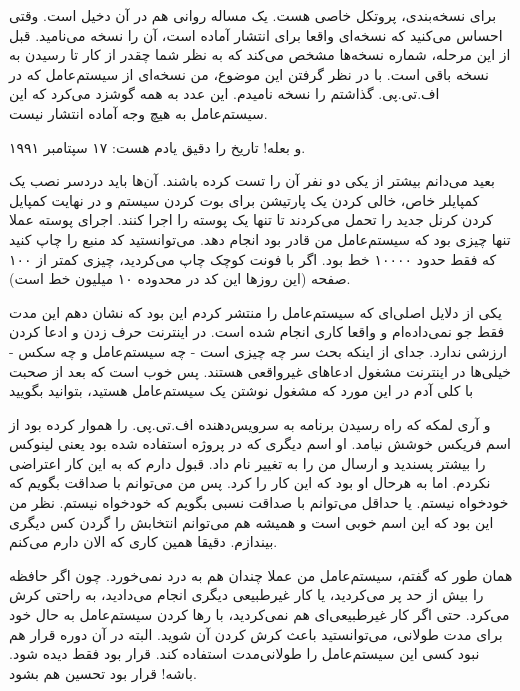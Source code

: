 برای نسخه‌بندی، پروتکل خاصی هست. یک مساله روانی هم در آن دخیل است. وقتی
احساس می‌کنید که نسخه‌ای واقعا برای انتشار آماده است، آن را نسخه
 می‌نامید. قبل از این مرحله، شماره نسخه‌ها مشخص می‌کند که به
نظر شما چقدر از کار تا رسیدن به نسخه  باقی است. با در نظر
گرفتن این موضوع، من نسخه‌ای از سیستم‌عامل که در اف.تی.پی. گذاشتم را نسخه
 نامیدم. این عدد به همه گوشزد می‌کرد که این سیستم‌عامل به هیچ
وجه آماده انتشار نیست.

و بعله! تاریخ را دقیق یادم هست: ۱۷ سپتامبر ۱۹۹۱. 

بعید می‌دانم بیشتر از یکی دو نفر آن را تست کرده باشند. آن‌ها باید دردسر
نصب یک کمپایلر خاص، خالی کردن یک پارتیشن برای بوت کردن سیستم و در
نهایت کمپایل کردن کرنل جدید را تحمل می‌کردند تا تنها یک پوسته را اجرا
کنند. اجرای پوسته عملا تنها چیزی بود که سیستم‌عامل من قادر بود انجام
دهد. می‌توانستید کد منبع را چاپ کنید که فقط حدود ۱۰۰۰۰ خط بود. اگر با
فونت کوچک چاپ می‌کردید، چیزی کمتر از ۱۰۰ صفحه (این روزها این کد در
محدوده ۱۰ میلیون خط است).

یکی از دلایل اصلی‌ای که سیستم‌عامل را منتشر کردم این بود که نشان دهم این
مدت فقط جو نمی‌داده‌ام و واقعا کاری انجام شده است. در اینترنت حرف زدن و
ادعا کردن ارزشی ندارد. جدای از اینکه بحث سر چه چیزی است - چه سیستم‌عامل
و چه سکس - خیلی‌ها در اینترنت مشغول ادعاهای غیرواقعی هستند. پس خوب است
که بعد از صحبت با کلی آدم در این مورد که مشغول نوشتن یک سیستم‌عامل
هستید، بتوانید بگویید 

و آری لمکه که راه رسیدن برنامه به سرویس‌دهنده اف.تی.پی. را هموار کرده
بود از اسم فریکس خوشش نیامد. او اسم دیگری که در پروژه استفاده شده بود
یعنی لینوکس را بیشتر پسندید و ارسال من را به  تغییر
نام داد. قبول دارم که به این کار اعتراضی نکردم. اما به هرحال او بود که
این کار را کرد. پس من می‌توانم با صداقت بگویم که خودخواه نیستم. یا
حداقل می‌توانم با صداقت نسبی بگویم که خودخواه نیستم. نظر من این بود که
این اسم خوبی است و همیشه هم می‌توانم انتخابش را گردن کس دیگری
بیندازم. دقیقا همین کاری که الان دارم می‌کنم.

همان طور که گفتم، سیستم‌عامل من عملا چندان هم به درد نمی‌خورد. چون اگر
حافظه را بیش از حد پر می‌کردید، یا کار غیرطبیعی دیگری انجام می‌دادید، به
راحتی کرش می‌کرد. حتی اگر کار غیرطبیعی‌ای هم
نمی‌کردید، با رها کردن سیستم‌عامل به حال خود برای مدت طولانی، می‌توانستید
باعث کرش کردن آن شوید. البته در آن دوره قرار هم نبود کسی این سیستم‌عامل
را طولانی‌مدت استفاده کند. قرار بود فقط دیده شود. باشه! قرار بود تحسین
هم بشود.

